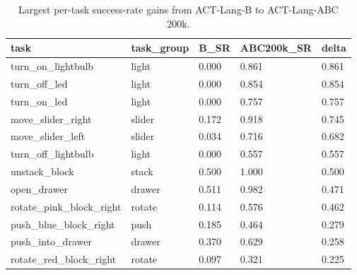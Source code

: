 \begin{table}[t]
\centering
\caption{Largest per-task success-rate gains from ACT-Lang-B to ACT-Lang-ABC 200k.}
\label{tab:task3-top-task-improvements}
\begin{tabular}{lllll}
\toprule
task & task\_group & B\_SR & ABC200k\_SR & delta \\
\midrule
turn\_on\_lightbulb & light & 0.000 & 0.861 & 0.861 \\
turn\_off\_led & light & 0.000 & 0.854 & 0.854 \\
turn\_on\_led & light & 0.000 & 0.757 & 0.757 \\
move\_slider\_right & slider & 0.172 & 0.918 & 0.745 \\
move\_slider\_left & slider & 0.034 & 0.716 & 0.682 \\
turn\_off\_lightbulb & light & 0.000 & 0.557 & 0.557 \\
unstack\_block & stack & 0.500 & 1.000 & 0.500 \\
open\_drawer & drawer & 0.511 & 0.982 & 0.471 \\
rotate\_pink\_block\_right & rotate & 0.114 & 0.576 & 0.462 \\
push\_blue\_block\_right & push & 0.185 & 0.464 & 0.279 \\
push\_into\_drawer & drawer & 0.370 & 0.629 & 0.258 \\
rotate\_red\_block\_right & rotate & 0.097 & 0.321 & 0.225 \\
\bottomrule
\end{tabular}
\end{table}
